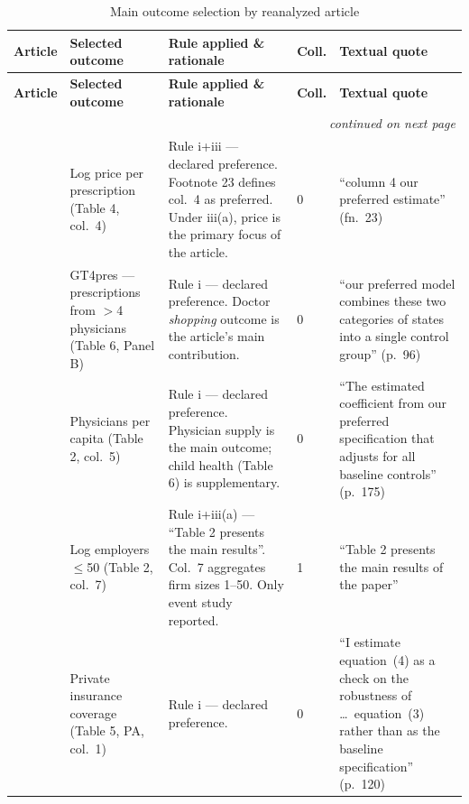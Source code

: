\begin{small}
\setlength{\LTleft}{-1cm}
\setlength{\LTright}{-1cm}
\begin{longtable}{p{2.2cm} p{3.0cm} p{5.5cm} p{0.8cm} p{4cm}}
\caption{Main outcome selection by reanalyzed article}\label{tab:decision_log}\\
\toprule
\textbf{Article} & \textbf{Selected outcome} & \textbf{Rule applied \& rationale} & \textbf{Coll.} & \textbf{Textual quote} \\
\midrule
\endfirsthead
\toprule
\textbf{Article} & \textbf{Selected outcome} & \textbf{Rule applied \& rationale} & \textbf{Coll.} & \textbf{Textual quote} \\
\midrule
\endhead
\midrule
\multicolumn{5}{r}{\footnotesize\itshape continued on next page} \\
\endfoot
\bottomrule
\endlastfoot


\textcite{dranove2021dose}
& Log price per prescription (Table 4, col.~4)
& Rule i+iii --- declared preference. Footnote 23 defines col.~4 as preferred. Under iii(a), price is the primary focus of the article.
& 0
& ``column 4 our preferred estimate'' (fn.~23) \\

\textcite{buchmueller2018effect}
& GT4pres --- prescriptions from $>$4 physicians (Table 6, Panel B)
& Rule i --- declared preference. Doctor \emph{shopping} outcome is the article's main contribution.
& 0
& ``our preferred model combines these two categories of states into a single control group'' (p.~96) \\

\textcite{carrillo2019provider}
& Physicians per capita (Table 2, col.~5)
& Rule i --- declared preference. Physician supply is the main outcome; child health (Table 6) is supplementary.
& 0
& ``The estimated coefficient from our preferred specification that adjusts for all baseline controls'' (p.~175) \\

\textcite{bosch2014tradeoffs}
& Log employers $\leq$50 (Table 2, col.~7)
& Rule i+iii(a) --- ``Table 2 presents the main results''. Col.~7 aggregates firm sizes 1--50. Only event study reported.
& 1
& ``Table 2 presents the main results of the paper'' \\

\textcite{clemens2015regulatory}
& Private insurance coverage (Table 5, PA, col.~1)
& Rule i --- declared preference.
& 0
& ``I estimate equation~(4) as a check on the robustness of \ldots\ equation~(3) rather than as the baseline specification'' (p.~120) \\


\end{longtable}
\end{small}

